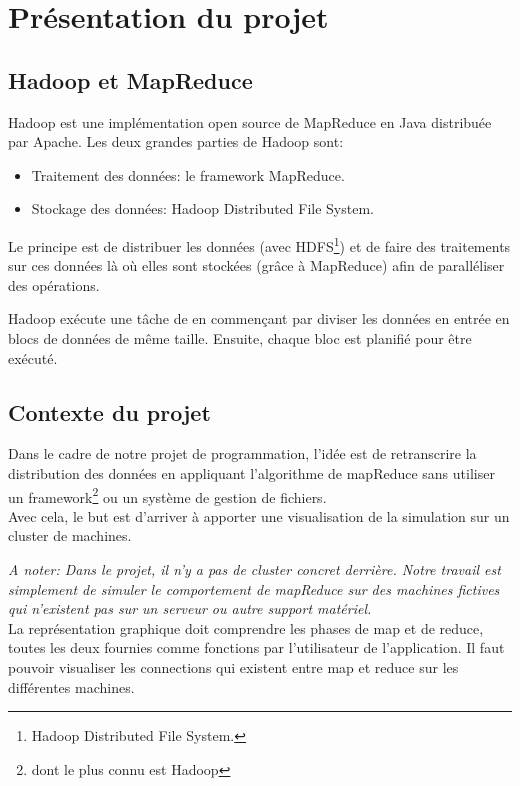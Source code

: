 \chapter{Présentation du projet}

\section{Hadoop et MapReduce}
Hadoop\cite{HadoopMapReduce} est une implémentation open source de MapReduce en Java distribuée par Apache.
 Les deux grandes parties de Hadoop sont:
\begin{itemize}
	\item Traitement des données: le framework MapReduce.
  	\item Stockage des données: Hadoop Distributed File System. 
 \end{itemize}
 Le principe est de distribuer les données (avec HDFS\footnote{Hadoop Distributed File System.}) et de faire des traitements sur ces données là où elles sont stockées (grâce à MapReduce) afin de paralléliser des opérations.

Hadoop exécute une tâche de en commençant par diviser les données en entrée en blocs de données de même taille. Ensuite, chaque bloc est planifié pour être exécuté.

\section{Contexte du projet}

Dans le cadre de notre projet de programmation, l'idée est de retranscrire la distribution des données en appliquant l'algorithme de mapReduce sans utiliser un framework\footnote{dont le plus connu est Hadoop} ou un système de gestion de fichiers.\\
Avec cela, le but est d'arriver à apporter une visualisation de la simulation sur un cluster de machines.

\textit{A noter: Dans le projet, il n'y a pas de cluster concret derrière. Notre travail est simplement de simuler le comportement de mapReduce sur des machines fictives qui n'existent pas sur un serveur ou autre support matériel.}\\

La représentation graphique doit comprendre les phases de map et de reduce, toutes les deux fournies comme fonctions par l'utilisateur de l'application. Il faut pouvoir visualiser les connections qui existent entre map et reduce sur les différentes machines.\\

